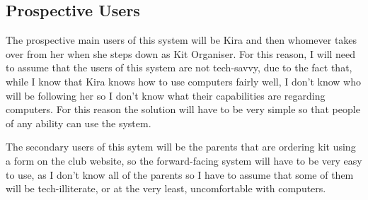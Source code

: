 \documentclass[
11pt, %
a4paper, %
oneside, %
headinclude,footinclude, %
BCOR5mm, %
]{scrartcl}
\begin{document}
\subsection{Prospective Users}
The prospective main users of this system will be Kira and then whomever takes over from her when she steps down as Kit Organiser. For this reason, I will need to assume that the users of this system are not tech-savvy, due to the fact that, while I know that Kira knows how to use computers fairly well, I don't know who will be following her so I don't know what their capabilities are regarding computers. For this reason the solution will have to be very simple so that people of any ability can use the system. \par 
The secondary users of this sytem will be the parents that are ordering kit using a form on the club website, so the forward-facing system will have to be very easy to use, as I don't know all of the parents so I have to assume that some of them will be tech-illiterate, or at the very least, uncomfortable with computers. 
\end{document}
